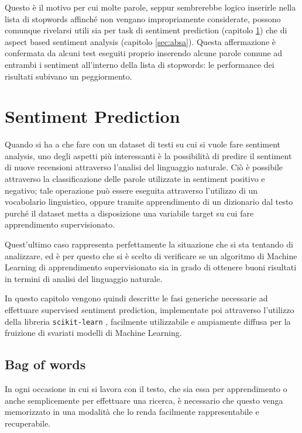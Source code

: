 \documentclass[hidelinks, 12pt]{article}
\begin{document}
Questo è il motivo per cui molte parole, seppur sembrerebbe logico inserirle nella lista di stopwords affinché non vengano impropriamente considerate, possono comunque rivelarsi utili sia per task di sentiment prediction (capitolo \ref{sec:sentiment-prediction}) che di aspect based sentiment analysis (capitolo \ref{sec:absa}). Questa affermazione è confermata da alcuni test eseguiti proprio inserendo alcune parole comune ad entrambi i sentiment all'interno della lista di stopwords: le performance dei risultati subivano un peggiormento.



\clearpage



\section{Sentiment Prediction}
\label{sec:sentiment-prediction}


Quando si ha a che fare con un dataset di testi su cui si vuole fare sentiment analysis, uno degli aspetti più interessanti è la possibilità di predire il sentiment di nuove recensioni attraverso l'analisi del linguaggio naturale. Ciò è possibile attraverso la classificazione delle parole utilizzate in sentiment positivo e negativo; tale operazione può essere eseguita attraverso l'utilizzo di un vocabolario linguistico, oppure tramite apprendimento di un dizionario dal testo purché il dataset metta a disposizione una variabile target su cui fare apprendimento supervisionato.

Quest'ultimo caso rappresenta perfettamente la situazione che si sta tentando di analizzare, ed è per questo che si è scelto di verificare se un algoritmo di Machine Learning di apprendimento supervisionato sia in grado di ottenere buoni risultati in termini di analisi del linguaggio naturale.

In questo capitolo vengono quindi descritte le fasi generiche necessarie ad effettuare supervised sentiment prediction, implementate poi attraverso l'utilizzo della libreria \texttt{scikit-learn} \cite{site:sklearn}, facilmente utilizzabile e ampiamente diffusa per la fruizione di svariati modelli di Machine Learning.



\subsection{Bag of words}


In ogni occasione in cui si lavora con il testo, che sia essa per apprendimento o anche semplicemente per effettuare una ricerca, è necessario che questo venga memorizzato in una modalità che lo renda facilmente rappresentabile e recuperabile.
\end{document}
